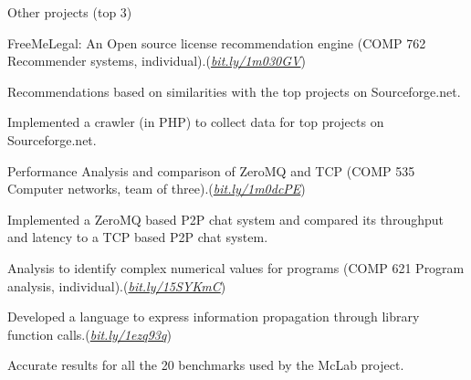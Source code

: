 \documentclass{resume} %
\begin{document}


\begin{rSection}{Other projects {\MakeLowercase{(top 3)}}}\smallskip \begin{lSubsection}
  
\item FreeMeLegal: An Open source license recommendation
engine (COMP 762 Recommender systems,
individual).(\href{http://bit.ly/1m030GV}{\em{bit.ly/1m030GV}}) 
\begin{lsubSubsection}
\item Recommendations based on similarities with the top projects on
Sourceforge.net.
\item Implemented a crawler (in {PHP}) to collect data for top projects 
on Sourceforge.net.
\end{lsubSubsection}
\item Performance
Analysis and comparison of ZeroMQ and TCP (COMP 535 Computer networks, team of
three).(\href{http://bit.ly/1m0dcPE}{\em{bit.ly/1m0dcPE}})  
\begin{lsubSubsection}
\item Implemented a ZeroMQ based P2P chat system and compared its throughput
  and latency to a TCP based P2P chat system.
\end{lsubSubsection}

\item Analysis to identify complex numerical values for \matlab programs (COMP
621 Program analysis,
individual).(\href{https://github.com/Sable/mclab/tree/master/languages/Natlab/src/natlab/tame/valueanalysis/components/isComplex}{\em{bit.ly/15SYKmC}}) 
\begin{lsubSubsection}
\item Developed a language to express information propagation through library
function calls.(\href{http://bit.ly/1ezq93q}{\em{bit.ly/1ezq93q}})
\item Accurate results for all the 20 benchmarks used by the 
McLab project.   
\end{lsubSubsection}


\end{lSubsection}
\end{rSection}
\end{document}

